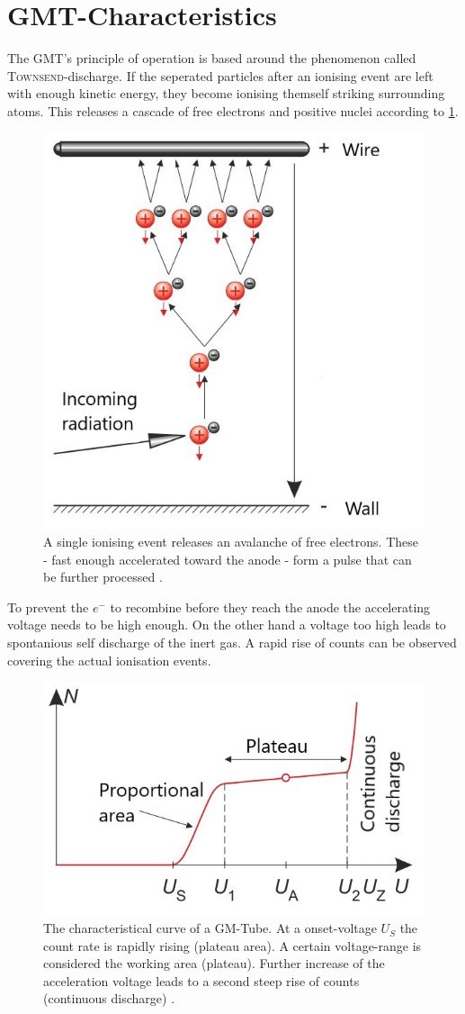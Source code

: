 \section{GMT-Characteristics}
%
%
The GMT's principle of operation is based around the phenomenon called \textsc{Townsend}-discharge. If the seperated
particles after an ionising event are left with enough kinetic energy, they become ionising themself striking surrounding
atoms. This releases a cascade of free electrons and positive nuclei according to \cref{fig:avalanche_discharge}.
\begin{figure}[h]
    \centering
    \includegraphics[width=.4\textwidth]{referenzen/scheme_avalanche.jpg}
    \caption{A single ionising event releases an avalanche of free electrons. These - fast enough accelerated toward the anode - form a pulse that can be further processed \cite{Eichler.2016}.}
    \label{fig:avalanche_discharge}
\end{figure}
To prevent the \(e^-\) to recombine before they reach the anode the accelerating voltage needs to be high enough. On the
other hand a voltage too high leads to spontanious self discharge of the inert gas. A rapid rise of counts can be observed
covering the actual ionisation events.
\begin{figure}[h]
    \centering
    \includegraphics[width=.5\textwidth]{referenzen/gmt_plot.jpg}
    \caption[Characteristical curve of a GMT]{The characteristical curve of a GM-Tube. At a onset-voltage \(U_S\) the count rate is rapidly rising (plateau area). A certain voltage-range 
    is considered the working area (plateau). Further increase of the acceleration voltage leads to a second steep rise of counts (continuous discharge) \cite{Eichler.2016}.}
\end{figure}
